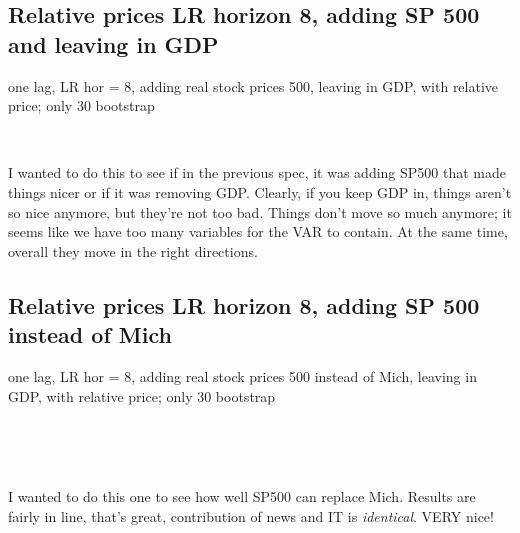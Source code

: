 \documentclass{article}
\def \ourFigPath {../}
\begin{document}
\newpage
	\subsection{Relative prices LR horizon 8, adding SP 500 and leaving in GDP}
	\noindent one lag, LR hor = 8, adding real stock prices 500, leaving in GDP, with relative price; only 30 bootstrap
	
	
	
	
	\begin{figure}[h!]
\centering
{} \hspace{.2in%
} 
\end{figure}

\

I wanted to do this to see if in the previous spec, it was adding SP500 that made things nicer or if it was removing GDP. Clearly, if you keep GDP in, things aren't so nice anymore, but they're not too bad. Things don't move so much anymore; it seems like we have too many variables for the VAR to contain. At the same time, overall they move in the right directions. 

\newpage
	\subsection{Relative prices LR horizon 8, adding SP 500 instead of Mich}
	\noindent one lag, LR hor = 8, adding real stock prices 500 instead of Mich, leaving in GDP, with relative price; only 30 bootstrap
	
	\
	
	
	
	
	\begin{figure}[h!]
\centering
{} \hspace{.2in%
} 
\end{figure}

\

I wanted to do this one to see how well SP500 can replace Mich. Results are fairly in line, that's great, contribution of news and IT is \emph{identical}. VERY nice!
\newpage
\end{document}

